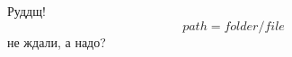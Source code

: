 \documentclass[12pt]{article}
\begin{document}
Руддщ!
\begin{equation}
path=folder/file
\end{equation}
не ждали, а надо?
\end{document}
